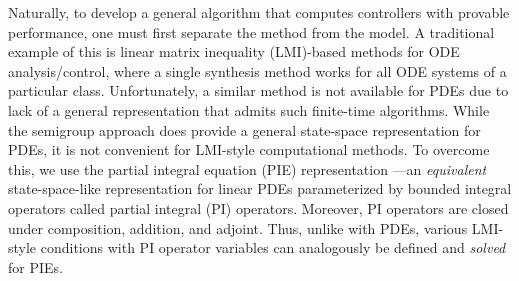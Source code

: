 \documentclass[letterpaper, 10 pt, conference]{ieeeconf}
\theoremstyle{definition}
\begin{document}
Naturally, to develop a general algorithm that computes controllers with provable performance, one must first separate the method from the model. A traditional example of this is linear matrix inequality (LMI)-based methods for ODE analysis/control, where a single synthesis method works for all ODE systems of a particular class. Unfortunately, a similar method is not available for PDEs due to lack of a general representation that admits such finite-time algorithms. While the semigroup approach \cite{curtain2012introduction} does provide a general state-space representation for PDEs, it is not convenient for LMI-style computational methods. To overcome this, we use the partial integral equation (PIE) representation \cite{shivakumar_extension_2024}---an \textit{equivalent} state-space-like representation for linear PDEs parameterized by bounded integral operators called partial integral (PI) operators. Moreover, PI operators are closed under composition, addition, and adjoint. Thus, unlike with PDEs, various LMI-style conditions with PI operator variables can analogously be defined and \emph{solved} for PIEs. %
\end{document}
